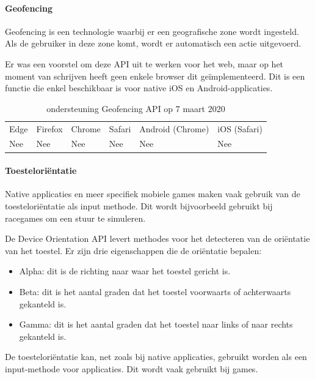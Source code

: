 	
	\paragraph{Geofencing}
	Geofencing is een technologie waarbij er een geografische zone wordt ingesteld. Als de gebruiker in deze zone komt, wordt er automatisch een actie uitgevoerd. 
	
	Er was een voorstel om deze API \autocite{Kruisselbrink2017} uit te werken voor het web, maar op het moment van schrijven heeft geen enkele browser dit geïmplementeerd. Dit is een functie die enkel beschikbaar is voor native iOS en Android-applicaties.
	
	\begin{table}[H]
		\centering
		\begin{tabular}{llllll}
			Edge & Firefox & Chrome & Safari & Android (Chrome) & iOS (Safari) \\
			Nee   & Nee      &  Nee     & Nee     & Nee               & Nee          
		\end{tabular}	
		\caption{ondersteuning Geofencing API op 7 maart 2020}
	\end{table}
	
	\paragraph{Toesteloriëntatie }
	
	Native applicaties en meer specifiek mobiele games maken vaak gebruik van de toesteloriëntatie als input methode. Dit wordt bijvoorbeeld gebruikt bij racegames om een stuur te simuleren.
	
	De Device Orientation API \autocite{Tibbett2019} levert methodes voor het detecteren van de oriëntatie van het toestel. Er zijn drie eigenschappen die de oriëntatie bepalen:
	
	
	 \begin{itemize}
		\item	Alpha:  dit is de richting naar waar het toestel gericht is.
		\item	Beta:  dit is het aantal graden dat het toestel voorwaarts of achterwaarts gekanteld is.
		\item   Gamma: dit is het aantal graden dat het toestel naar links of naar rechts gekanteld is.
	\end{itemize}
	
	
	De toesteloriëntatie kan, net zoals bij native applicaties, gebruikt worden als een input-methode voor applicaties. Dit wordt vaak gebruikt bij games.
	
